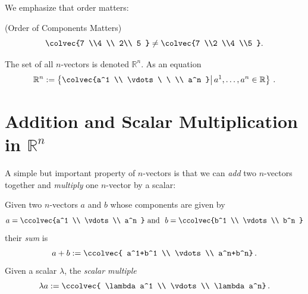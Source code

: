 \vspace{1mm}
We emphasize  that order matters: 
\begin{example} (Order of Components Matters)
\[\colvec{7 \\4 \\ 2\\ 5 } 
\neq \colvec{7 \\2 \\4 \\5 } .\]
\end{example}
The set of all $n$-vectors is denoted $\mathbb{R}^n$. As an equation
\[
{\mathbb{R}}^n :=\left\{ \colvec{a^1 \\ \vdots\ \  \\ a^n } \middle\vert \,  a^1,\dots, a^n \in \mathbb{R} \right\} \,.
\]




\section{Addition and Scalar Multiplication in ${\mathbb{R}}^n$}
A simple but important property of $n$-vectors is that we can {\it add} two $n$-vectors together and {\it multiply} one $n$-vector by a scalar:

\begin{definition} Given two $n$-vectors \(a\) and \(b\) whose components are given by 
\[a=\ccolvec{a^1 \\ \vdots  \\ a^n } \mbox{ and }\  b=\ccolvec{b^1 \\ \vdots  \\ b^n }\] their \emph{sum} is \[a+b := \ccolvec{ a^1+b^1 \\ \vdots \\ a^n+b^n}\, .\]  
Given a scalar $\lambda$, the \emph{scalar multiple} \[\lambda a := \ccolvec{ \lambda a^1 \\ \vdots \\ \lambda a^n}\, .\]
\end{definition}

